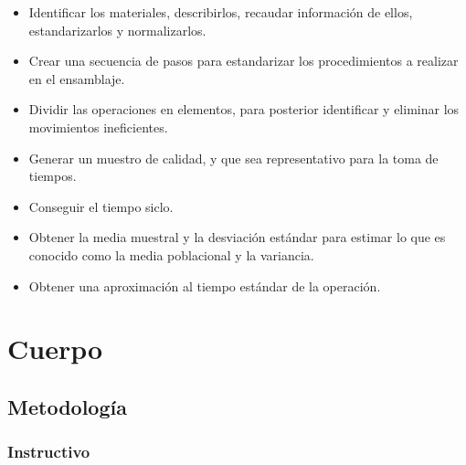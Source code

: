 \begin{itemize}
    \item Identificar los materiales, describirlos, recaudar información de ellos, estandarizarlos y normalizarlos.
    \item Crear una secuencia de pasos para estandarizar los procedimientos a realizar en el ensamblaje.
    \item Dividir las operaciones en elementos, para posterior identificar y eliminar los movimientos ineficientes.
    \item Generar un muestro de calidad, y que sea representativo para la toma de tiempos.
    \item Conseguir el tiempo siclo.
    \item Obtener la media muestral y la desviación estándar para estimar lo que es conocido como la media poblacional y la variancia.
    \item Obtener una aproximación al tiempo estándar de la operación.
    
\end{itemize}

% 
\section{Cuerpo }

\subsection{Metodología}

\subsubsection{Instructivo}

